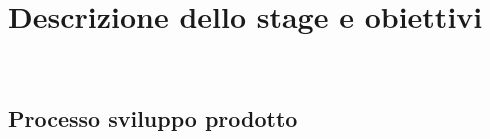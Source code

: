 
\chapter{Descrizione dello stage e obiettivi}
\label{cap:Descrizione dello stage e obiettivi}

\\

\section{Processo sviluppo prodotto}